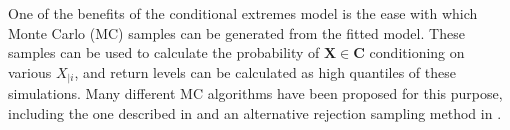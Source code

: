 \documentclass{article}
\numberwithin{equation}{section}
\begin{document}
One of the benefits of the conditional extremes model is the ease with which Monte Carlo (MC) samples can be generated from the fitted model.
These samples can be used to calculate the probability of $\bm{X} \in \bm{C}$ conditioning on various $X_{\mid i}$, and return levels can be calculated as high quantiles of these simulations.
Many different MC algorithms have been proposed for this purpose, including the one described in \citet{Heffernan2004} and an alternative rejection sampling method in \citet{Keef2012_flooding}.




\end{document}
